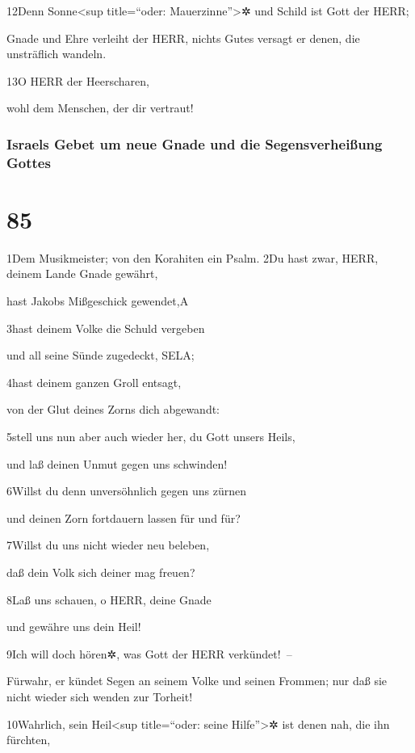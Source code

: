 12Denn Sonne\textless sup title=``oder: Mauerzinne''\textgreater✲ und
Schild ist Gott der HERR;

Gnade und Ehre verleiht der HERR, nichts Gutes versagt er denen, die
unsträflich wandeln.

13O HERR der Heerscharen,

wohl dem Menschen, der dir vertraut!

\hypertarget{israels-gebet-um-neue-gnade-und-die-segensverheiuxdfung-gottes}{%
\subsubsection{Israels Gebet um neue Gnade und die Segensverheißung
Gottes}\label{israels-gebet-um-neue-gnade-und-die-segensverheiuxdfung-gottes}}

\hypertarget{section-84}{%
\section{85}\label{section-84}}

1Dem Musikmeister; von den Korahiten ein Psalm. 2Du hast zwar, HERR,
deinem Lande Gnade gewährt,

hast Jakobs Mißgeschick gewendet,{A}

3hast deinem Volke die Schuld vergeben

und all seine Sünde zugedeckt, SELA;

4hast deinem ganzen Groll entsagt,

von der Glut deines Zorns dich abgewandt:

5stell uns nun aber auch wieder her, du Gott unsers Heils,

und laß deinen Unmut gegen uns schwinden!

6Willst du denn unversöhnlich gegen uns zürnen

und deinen Zorn fortdauern lassen für und für?

7Willst du uns nicht wieder neu beleben,

daß dein Volk sich deiner mag freuen?

8Laß uns schauen, o HERR, deine Gnade

und gewähre uns dein Heil!

9Ich will doch hören✲, was Gott der HERR verkündet!~--

Fürwahr, er kündet Segen an seinem Volke und seinen Frommen; nur daß sie
nicht wieder sich wenden zur Torheit!

10Wahrlich, sein Heil\textless sup title=``oder: seine
Hilfe''\textgreater✲ ist denen nah, die ihn fürchten,

